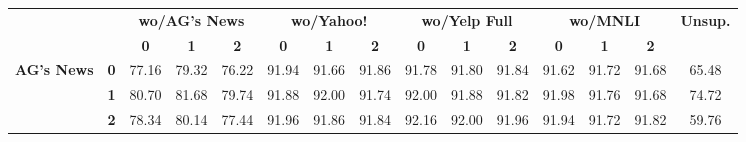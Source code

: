 \clearpage
\thispagestyle{empty}
\begin{sidewaystable*}[h]
	\centering
	\fontsize{8}{20}
	\selectfont
	\setlength\tabcolsep{1pt}
	\begin{tabular*}{\columnwidth}{l@{\extracolsep{\fill}}lccccccccccccc}
		\toprule
		\multicolumn{1}{l}{\textbf{}}       & \textbf{}  & \multicolumn{3}{c}{\textbf{wo/AG's News}}                                                              & \multicolumn{3}{c}{\textbf{wo/Yahoo!}}                                                               & \multicolumn{3}{c}{\textbf{wo/Yelp Full}}                                                           & \multicolumn{3}{c}{\textbf{wo/MNLI}}                                                                & \multicolumn{1}{c}{\multirow{2}{*}{\textbf{Unsup.}}} \\
		\multicolumn{1}{l}{\textbf{}}       & \textbf{}  & \multicolumn{1}{c}{\textbf{0}} & \multicolumn{1}{c}{\textbf{1}} & \multicolumn{1}{c}{\textbf{2}} & \multicolumn{1}{c}{\textbf{0}} & \multicolumn{1}{c}{\textbf{1}} & \multicolumn{1}{c}{\textbf{2}} & \multicolumn{1}{c}{\textbf{0}} & \multicolumn{1}{c}{\textbf{1}} & \multicolumn{1}{c}{\textbf{2}} & \multicolumn{1}{c}{\textbf{0}} & \multicolumn{1}{c}{\textbf{1}} & \multicolumn{1}{c}{\textbf{2}} & \multicolumn{1}{c}{}    \\
		\hline
		\multirow{3}{*}{\textbf{AG's News}}    & \textbf{0} & 77.16                          & 79.32                          & 76.22                          & 91.94                          & 91.66                          & 91.86                          & 91.78                          & 91.80                          & 91.84                          & 91.62                          & 91.72                          & 91.68                          & 65.48                              \\
		& \textbf{1} & 80.70                          & 81.68                          & 79.74                          & 91.88                          & 92.00                          & 91.74                          & 92.00                          & 91.88                          & 91.82                          & 91.98                          & 91.76                          & 91.68                          & 74.72                              \\
		& \textbf{2} & 78.34                          & 80.14                          & 77.44                          & 91.96                          & 91.86                          & 91.84                          & 92.16                          & 92.00                          & 91.96                          & 91.94                          & 91.72                          & 91.82                          & 59.76                              \\

\end{tabular*}
\end{sidewaystable*}
